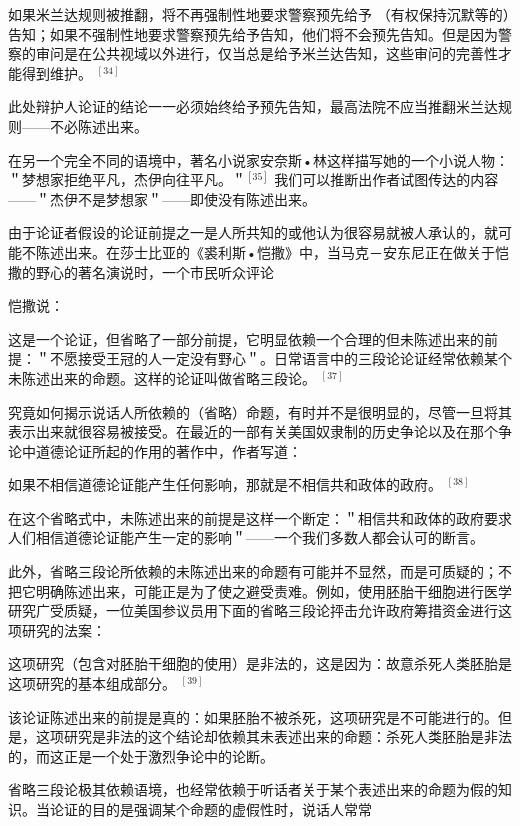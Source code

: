 如果米兰达规则被推翻，将不再强制性地要求警察预先给予 （有权保持沉默等的）告知；如果不强制性地要求警察预先给予告知，他们将不会预先告知。但是因为警察的审问是在公共视域以外进行，仅当总是给予米兰达告知，这些审问的完善性才能得到维护。 ${ }^{[34]}$

此处辩护人论证的结论一一必须始终给予预先告知，最高法院不应当推翻米兰达规则——不必陈述出来。

在另一个完全不同的语境中，著名小说家安奈斯•林这样描写她的一个小说人物：＂梦想家拒绝平凡，杰伊向往平凡。＂${ }^{[35]}$ 我们可以推断出作者试图传达的内容——＂杰伊不是梦想家＂——即使没有陈述出来。

由于论证者假设的论证前提之一是人所共知的或他认为很容易就被人承认的，就可能不陈述出来。在莎士比亚的《裘利斯•恺撒》中，当马克－安东尼正在做关于恺撒的野心的著名演说时，一个市民听众评论

恺撒说：

这是一个论证，但省略了一部分前提，它明显依赖一个合理的但未陈述出来的前提：＂不愿接受王冠的人一定没有野心＂。日常语言中的三段论论证经常依赖某个未陈述出来的命题。这样的论证叫做省略三段论。 ${ }^{[37]}$

究竟如何揭示说话人所依赖的（省略）命题，有时并不是很明显的，尽管一旦将其表示出来就很容易被接受。在最近的一部有关美国奴隶制的历史争论以及在那个争论中道德论证所起的作用的著作中，作者写道：

\begin{displayquote}
如果不相信道德论证能产生任何影响，那就是不相信共和政体的政府。 ${ }^{[38]}$
\end{displayquote}

在这个省略式中，未陈述出来的前提是这样一个断定：＂相信共和政体的政府要求人们相信道德论证能产生一定的影响＂——一个我们多数人都会认可的断言。

此外，省略三段论所依赖的未陈述出来的命题有可能并不显然，而是可质疑的；不把它明确陈述出来，可能正是为了使之避受责难。例如，使用胚胎干细胞进行医学研究广受质疑，一位美国参议员用下面的省略三段论抨击允许政府筹措资金进行这项研究的法案：

\begin{displayquote}
这项研究（包含对胚胎干细胞的使用）是非法的，这是因为：故意杀死人类胚胎是这项研究的基本组成部分。 ${ }^{[39]}$
\end{displayquote}

该论证陈述出来的前提是真的：如果胚胎不被杀死，这项研究是不可能进行的。但是，这项研究是非法的这个结论却依赖其未表述出来的命题：杀死人类胚胎是非法的，而这正是一个处于激烈争论中的论断。

省略三段论极其依赖语境，也经常依赖于听话者关于某个表述出来的命题为假的知识。当论证的目的是强调某个命题的虚假性时，说话人常常

